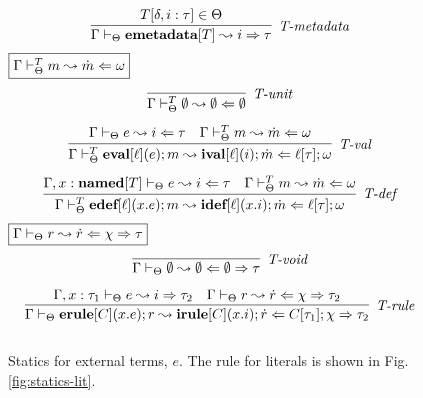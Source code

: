 \begin{figure}
\[\begin{array}{c}
\infer[\textit{T-metadata}]
        {\Gamma \vdash_\Theta \keyw{emetadata}[T]  \leadsto i  \Rightarrow \tau}
	{T[\delta, i : \tau] \in \Theta}
\end{array}
\]
$\fbox{$\Gamma \vdash_\Theta^T m \leadsto \dot m \Leftarrow \omega$}$
\vspace{-15px}\[
\begin{array}{c}
\infer[\textit{T-unit}]{\Gamma \vdash_\Theta^T \emptyset \leadsto \emptyset \Leftarrow \emptyset}{ }
\\[2ex]
\infer[\textit{T-val}]
	{\Gamma \vdash_\Theta^T \keyw{eval}[\ell](e); m \leadsto \keyw{ival}[\ell](i); \dot{m} \Leftarrow \ell[\tau]; \omega}
	{\Gamma \vdash_\Theta e \leadsto i \Leftarrow \tau & \Gamma \vdash_\Theta^T m \leadsto \dot{m} \Leftarrow \omega} \\[2ex]
	
\infer[\textit{T-def}]
	{\Gamma \vdash_\Theta^T \keyw{edef}[\ell](x.e); m  \leadsto \keyw{idef}[\ell](x.i); \dot m \Leftarrow \ell[\tau]; \omega}
	{\Gamma, x : \keyw{named}[T] \vdash_\Theta e \leadsto i \Leftarrow \tau & \Gamma \vdash_\Theta^T m \leadsto \dot m \Leftarrow \omega}
\end{array}
\]
$\fbox{$\Gamma \vdash_\Theta r \leadsto \dot{r} \Leftarrow \chi \Rightarrow \tau$}$
\vspace{-15px}\[
\begin{array}{c}
\infer[\textit{T-void}]
	{\Gamma \vdash_\Theta \emptyset \leadsto \emptyset \Leftarrow \emptyset \Rightarrow \tau}{ }\\[2ex]
\infer[\textit{T-rule}]
	{\Gamma \vdash_\Theta  \keyw{erule}[C](x.e); r \leadsto \keyw{irule}[C](x.i); \dot{r} \Leftarrow C[\tau_1]; \chi \Rightarrow \tau_2} 
	{\Gamma, x:\tau_1 \vdash_\Theta e \leadsto i \Rightarrow \tau_2
	 & \Gamma\vdash_\Theta r \leadsto \dot{r} \Leftarrow \chi \Rightarrow \tau_2}\\[2ex]
%
\end{array}
\]
\vspace{-10px}
\caption{Statics for external terms, $e$. The rule for literals is shown in Fig. \ref{fig:statics-lit}.}
\label{fig:statics1}
\end{figure}
